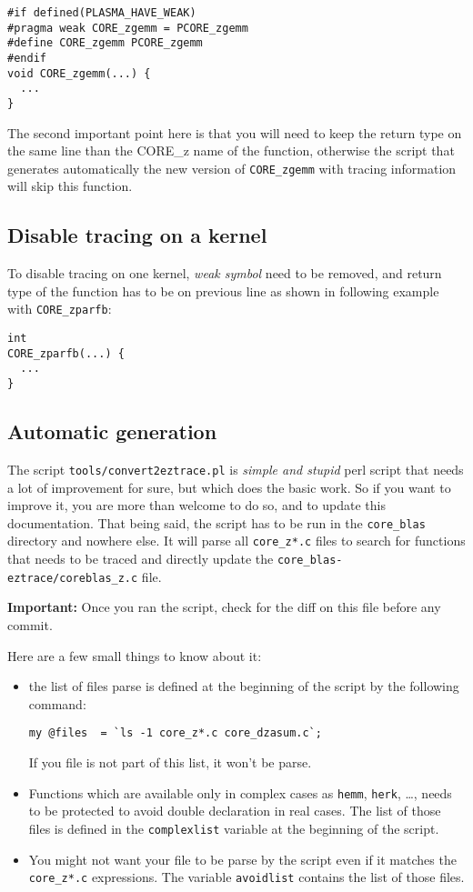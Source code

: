 \begin{verbatim}
#if defined(PLASMA_HAVE_WEAK)
#pragma weak CORE_zgemm = PCORE_zgemm
#define CORE_zgemm PCORE_zgemm
#endif
void CORE_zgemm(...) {
  ...
}
\end{verbatim}

The second important point here is that you will need to keep the
return type on the same line than the CORE\_z name of the function,
otherwise the script that generates automatically the new version of
\texttt{CORE\_zgemm} with tracing information will skip this function.

\subsection{Disable tracing on a kernel}

To disable tracing on one kernel, \emph{weak symbol} need to be
removed, and return type of the function has to be on previous line as
shown in following example with \texttt{CORE\_zparfb}:
\begin{verbatim}
int
CORE_zparfb(...) {
  ...
}
\end{verbatim}

\subsection{Automatic generation}

The script \texttt{tools/convert2eztrace.pl} is \emph{simple and stupid} perl script that
needs a lot of improvement for sure, but which does the basic work. So
if you want to improve it, you are more than welcome to do so, and to
update this documentation.
That being said, the script has to be run in the \texttt{core\_blas}
directory and nowhere else. It will parse all \texttt{core\_z*.c}
files to search for functions that needs to be traced and directly
update the \texttt{core\_blas-eztrace/coreblas\_z.c} file.

\textbf{Important:} Once you ran the script, check for the diff on
this file before any commit.

Here are a few small things to know about it:
\begin{itemize}
\item the list of files parse is defined at the beginning of the
  script by the following command:
\begin{verbatim}
my @files  = `ls -1 core_z*.c core_dzasum.c`;
\end{verbatim}
If you file is not part of this list, it won't be parse.

\item Functions which are available only in complex cases as
  \texttt{hemm}, \texttt{herk}, \dots, needs to be protected to avoid
  double declaration in real cases. The list of those files is defined
  in the \texttt{complexlist} variable at the beginning of the script.

\item You might not want your file to be parse by the script even if
  it matches the \texttt{core\_z*.c} expressions. The variable
  \texttt{avoidlist} contains the list of those files.

\end{itemize}

